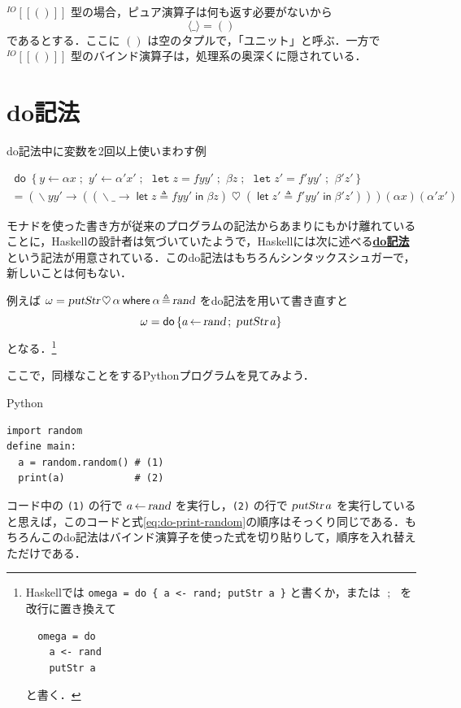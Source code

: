 \documentclass[a4paper,twocolumn]{jsbook}
\def\[{\left[\!\left[}
\def\]{\right]\!\right]}
\newcommand{\programminglanguage}[1]{\textsf{#1}}
\newcommand{\haskell}{\programminglanguage{Haskell}}
\newcommand{\python}{\programminglanguage{Python}}
\newcommand{\keyword}[1]{{\underline{\textbf{#1}}}}
\newcommand{\code}[1]{\texttt{#1}}
\newenvironment{pythoncode}{\begin{itembox}[r]{\python}}{\end{itembox}}
\newcommand{\mKeyword}[1]{\mathsf{#1}} %
\newcommand{\mVarKeyword}[1]{\texttt{#1}} %
\newcommand{\mDoKeyword}{\mKeyword{do}}
\newcommand{\mDoLetKeyword}{\mVarKeyword{let}}
\newcommand{\mInKeyword}{\mKeyword{in}}
\newcommand{\mLetKeyword}{\mKeyword{let}}
\newcommand{\mWhereKeyword}{\mKeyword{where}}
\DeclareMathOperator{\mDoKW}{\mDoKeyword}
\DeclareMathOperator{\mInKW}{\mInKeyword} %
\DeclareMathOperator{\mLetKW}{\mLetKeyword} %
\newcommand{\mAnyParam}{\_}
\newcommand{\mAction}[1]{\textsl{#1}}
\DeclareMathOperator{\mPutStr}{\mAction{putStr}}
\DeclareMathOperator{\mRand}{\mAction{rand}}
\DeclareMathOperator{\mBind}{\heartsuit}
\DeclareMathOperator{\mDoEq}{\leftarrow}
\DeclareMathOperator{\mDoLetEq}{\mVarKeyword{=}}
\DeclareMathOperator{\mDoNext}{;\;}%
\DeclareMathOperator{\mLambda}{\backslash}
\DeclareMathOperator{\mLambdaArrow}{\rightarrow}
\DeclareMathOperator{\mLetEq}{\triangleq}
\newcommand{\mType}[1]{\mathbf{#1}}
\newcommand{\mUnitType}{\mType{()}}
\newcommand{\mIOUnitType}{\mIOType{\mUnitType}}
\newcommand{\mTypeConstructor}[1]{\textit{#1}}
\newcommand{\mGenericTypeAssemble}[2]{{}^{\mTypeConstructor{#1}}\[\mType{#2}\]}
\newcommand{\mIOType}[1]{\mGenericTypeAssemble{IO}{#1}}
\newcommand{\mPureWith}[1]{\langle#1\rangle}
\newcommand{\mTupleWith}[1]{\left(#1\right)}
\newcommand{\mDo}[1]{\mDoKW\left\{#1\right\}}
\newcommand{\mDoLet}[2]{\mathop{\mDoLetKeyword}#1\mDoLetEq#2}
\newcommand{\mLambdaExp}[2]{\mLambda{#1}\mLambdaArrow{#2}}
\newcommand{\mLetIn}[3]{\mLetKW#1\mLetEq#2\mInKW{#3}}
\newcommand{\mWhereIs}[2]{\mathbin{\mWhereKeyword}#1\mLetEq#2}
\begin{document}
$\mIOUnitType$ 型の場合，ピュア演算子は何も返す必要がないから
\begin{equation}
\mPureWith{\mAnyParam}=\mTupleWith{}
\end{equation}
であるとする．ここに $\mTupleWith{}$ は空のタプルで，「ユニット」と呼ぶ．一方で $\mIOUnitType$ 型のバインド演算子は，処理系の奥深くに隠されている．




\section{do記法}

\begin{table}[tp]
\label{tab:do-alpha-alpha}
\caption{do記法中に変数を2回以上使いまわす例}
\begin{screen}
\begin{multline*}
\mDo{y\mDoEq\alpha x\mDoNext y'\mDoEq\alpha'x'\mDoNext\mDoLet{z}{fyy'}\mDoNext\beta z\mDoNext\mDoLet{z'}{f'yy'}\mDoNext\beta'z'}\\
=
(\mLambdaExp{yy'}{(
(\mLambdaExp{\mAnyParam}{\mLetIn{z}{fyy'}{\beta z}})
\mBind{}(\mLetIn{z'}{f'yy'}{\beta'z'}))})
(\alpha x)(\alpha'x')
\end{multline*}
\end{screen}
\end{table}

モナドを使った書き方が従来のプログラムの記法からあまりにもかけ離れていることに，\haskell の設計者は気づいていたようで，\haskell には次に述べる\keyword{do記法}という記法が用意されている．このdo記法はもちろんシンタックスシュガーで，新しいことは何もない．

例えば $\omega=\mPutStr\mBind\alpha\mWhereIs{\alpha}{\mRand}$ をdo記法を用いて書き直すと
\begin{equation}
\label{eq:do-print-random}
\omega=\mDo{a\mDoEq\mRand\mDoNext\mPutStr a}
\end{equation}
となる．\footnote{\haskell では \code{omega = do \{ a <- rand; putStr a \}} と書くか，または $\mDoNext$ を改行に置き換えて
\begin{verbatim}
  omega = do
    a <- rand
    putStr a
\end{verbatim}
と書く．}

ここで，同様なことをする\python プログラムを見てみよう．
\begin{pythoncode}
\begin{verbatim}
import random
define main:
  a = random.random() # (1)
  print(a)            # (2)
\end{verbatim}
\end{pythoncode}
コード中の \code{(1)} の行で $a\mDoEq\mRand$ を実行し，\code{(2)} の行で $\mPutStr a$ を実行していると思えば，このコードと式\eqref{eq:do-print-random}の順序はそっくり同じである．もちろんこのdo記法はバインド演算子を使った式を切り貼りして，順序を入れ替えただけである．
\end{document}
